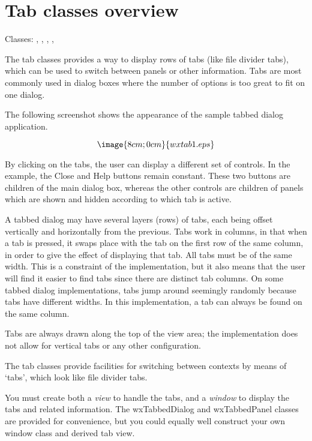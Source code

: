 \section{Tab classes overview}\label{wxtaboverview}

Classes: , ,
 , ,

The tab classes provides a way to display rows of tabs (like file divider tabs), which can be
used to switch between panels or other information. Tabs are most
commonly used in dialog boxes where the number of options is too great
to fit on one dialog.


The following screenshot shows the appearance of the sample tabbed dialog application.

$$\image{8cm;0cm}{wxtab1.eps}$$

By clicking on the tabs, the user can display a different set of controls. In the example,
the Close and Help buttons remain constant. These two buttons are children of the main dialog box,
whereas the other controls are children of panels which are shown and hidden according to
which tab is active.

A tabbed dialog may have several layers (rows) of tabs, each being
offset vertically and horizontally from the previous. Tabs work in
columns, in that when a tab is pressed, it swaps place with the tab on
the first row of the same column, in order to give the effect of
displaying that tab. All tabs must be of the same width.
This is a constraint of the implementation, but it also
means that the user will find it easier to find tabs since there are
distinct tab columns. On some tabbed dialog implementations, tabs jump around
seemingly randomly because tabs have different widths.
In this implementation, a tab can always be found on the same column.

Tabs are always drawn along the top of the view area; the implementation does
not allow for vertical tabs or any other configuration.


The tab classes provide facilities for switching between contexts by
means of `tabs', which look like file divider tabs.

You must create both a {\it view} to handle the tabs, and a {\it window} to display the tabs
and related information. The wxTabbedDialog and wxTabbedPanel classes are provided for
convenience, but you could equally well construct your own window class and derived
tab view.

